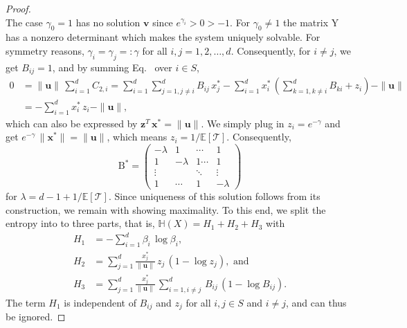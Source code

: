 \documentclass[smallextended]{svjour3}
\makeatletter
\renewcommand*{\eqref}[1]{%
  \hyperref[{#1}]{\textup{\tagform@{\ref*{#1}}}}%
}
\renewcommand{\tens}[1]{\mathrm{#1}}
\renewcommand{\vec}[1]{\mathbf{#1}}
\newcommand{\E}{\mathbb{E}}
\newcommand{\TT}{\mathcal{T}}
\renewcommand{\H}{\mathbb{H}}
\newcommand{\suml}{\sum\limits}
\newcommand{\vnorms}[1]{\|#1\|}
\newcommand{\ie}{that is}
\makeatother
\begin{document}
\begin{proof}
\begin{equation}
		\end{equation}
		The case $\gamma_0=1$ has no solution $\vec{v}$ since $e^{\gamma_i}>0>-1$.
		For $\gamma_0\neq 1$ the matrix $\tens{Y}$ has a nonzero determinant which makes the system uniquely solvable.
		For symmetry reasons, $\gamma_i=\gamma_j=:\gamma$ for all $i,j=1,2,\ldots,d$.
		Consequently, for $i\neq j$, we get $B_{ij}=1$, and by summing Eq.~\eqref{eqn:constraint_C2} over $i\in S$,
		\begin{equation}
		\begin{aligned}
			0 &= \vnorms{\vec{u}}\,\suml_{i=1}^d C_{2,i} = \suml_{i=1}^d \suml_{j=1,j\neq i}^d B_{ij}\,x_j^\ast - \suml_{i=1}^d x_i^\ast\,\left(\suml_{k=1,k\neq i}^d B_{ki}+z_i\right) - \vnorms{\vec{u}}\\
			&= -\suml_{i=1}^d x_i^\ast\,z_i - \vnorms{\vec{u}},		
		\end{aligned}
		\end{equation}
		which can also be expressed by $\vec{z}^T\,\vec{x}^\ast = \vnorms{\vec{u}}$.
		We simply plug in $z_i=e^{-\gamma}$ and get $e^{-\gamma}\,\vnorms{\vec{x}^\ast} = \vnorms{\vec{u}}$, which means $z_i = 1/\E\left[\TT\right]$.
		Consequently,
		\begin{equation}
			\tens{B}^\ast = \begin{pmatrix}
									-\lambda & 1 & \cdots & 1\\
									1 & -\lambda & 1 \cdots & 1 \\
									\vdots & & \ddots & \vdots\\
									1 & \cdots & 1 & -\lambda
							\end{pmatrix}
		\end{equation}
		for $\lambda=d-1+1/\E\left[\TT\right]$.
		Since uniqueness of this solution follows from its construction, we remain with showing maximality.
		To this end, we split the entropy into to three parts, \ie, $\H(X) = H_1 + H_2 + H_3$ with
		\begin{equation}
			\begin{aligned}
				H_1 &= -\suml_{i=1}^d\beta_i\,\log\beta_i,\\
				H_2 &= \suml_{j=1}^d \frac{x^\ast_j}{\vnorms{\vec{u}}}\,z_j\,(1-\log z_j), \text{ and}\\
				H_3 &= \suml_{j=1}^d \frac{x^\ast_j}{\vnorms{\vec{u}}}\,\suml_{i=1,i\neq j}^d \,B_{ij}\,(1-\log B_{ij}).
			\end{aligned}
		\end{equation}
		The term $H_1$ is independent of $B_{ij}$ and $z_j$ for all $i,j\in S$ and $i\neq j$, and can thus be ignored.

\end{proof}
\end{document}
